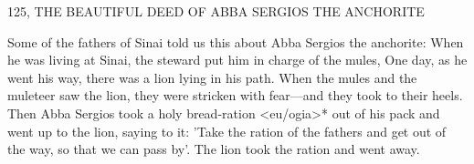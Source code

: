 125, THE BEAUTIFUL DEED OF ABBA SERGIOS
THE ANCHORITE

Some of the fathers of Sinai told us this about Abba Sergios the
anchorite: When he was living at Sinai, the steward put him in
charge of the mules, One day, as he went his way, there was a lion
lying in his path.
When the mules and the muleteer saw the lion,
they were stricken with fear—and they took to their heels.
Then
Abba Sergios took a holy bread-ration <eu/ogia>* out of his pack
and went up to the lion, saying to it: 'Take the ration of the fathers
and get out of the way, so that we can pass by'.
The lion took the
ration and went away.

